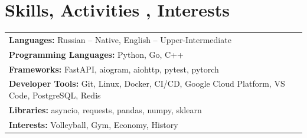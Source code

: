 \documentclass[11pt,a4paper,sans]{moderncv}
\begin{document}

\section{Skills, Activities , Interests}
\noindent
\begin{tabularx}{\textwidth}{@{}l X@{}}
\textbf{Languages:}  Russian -- Native, English -- Upper-Intermediate \\
\textbf{Programming Languages:}  Python, Go, C++ \\
\textbf{Frameworks:}  FastAPI, aiogram, aiohttp, pytest, pytorch \\
\textbf{Developer Tools:} Git, Linux, Docker, CI/CD, Google Cloud Platform, VS Code, PostgreSQL, Redis\\
\textbf{Libraries:}  asyncio, requests, pandas, numpy, sklearn  \\
\textbf{Interests:}  Volleyball, Gym, Economy, History \\
\end{tabularx}

\end{document}

